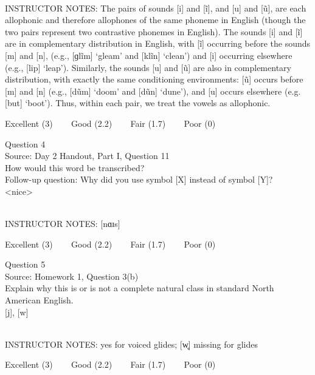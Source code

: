 \documentclass[12pt]{article}
\begin{document}
~\\
INSTRUCTOR NOTES: The pairs of sounds [i] and [ĩ], and [u] and [ũ], are each allophonic and therefore allophones of the same phoneme in English (though the two pairs represent two contrastive phonemes in English). The sounds [i] and [ĩ] are in complementary distribution in English, with [ĩ] occurring before the sounds [m] and [n], (e.g., [ɡlĩm] ‘gleam’ and [klĩn] ‘clean’) and [i] occurring elsewhere (e.g., [lip] ‘leap’). Similarly, the sounds [u] and [ũ] are also in complementary distribution, with exactly the same conditioning environments: [ũ] occurs before [m] and [n] (e.g., [dũm] ‘doom’ and [dũn] ‘dune’), and [u] occurs elsewhere (e.g. [but] ‘boot’). Thus, within each pair, we treat the vowels as allophonic. 


\vfill
Excellent (3) ~~~ Good (2.2) ~~~ Fair (1.7) ~~~ Poor (0)
\newpage

{\large Question 4}\\

Source: Day 2 Handout, Part I, Question 11\\

How would this word be transcribed?\\ Follow-up question: Why did you use symbol [X] instead of symbol [Y]?\\

<nice>


~\\
INSTRUCTOR NOTES: [nɑɪs]


\vfill
Excellent (3) ~~~ Good (2.2) ~~~ Fair (1.7) ~~~ Poor (0)
\newpage

{\large Question 5}\\

Source: Homework 1, Question 3(b)\\

Explain why this is or is not a complete natural class in standard North American English.\\

{[j]}, {[w]}


~\\
INSTRUCTOR NOTES: yes for voiced glides; [w̥] missing for glides


\vfill
Excellent (3) ~~~ Good (2.2) ~~~ Fair (1.7) ~~~ Poor (0)
\newpage

\begin{center}
\textbf{{\color{red}{\HUGE END OF EXAM}}}\\

\end{center}
\newpage
\end{document}
